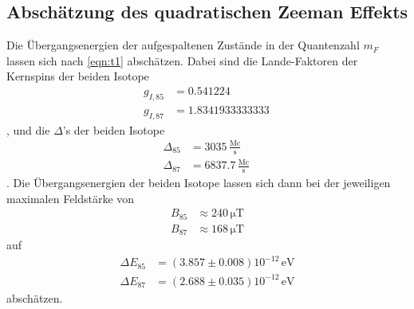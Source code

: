 \subsection{Abschätzung des quadratischen Zeeman Effekts}
\label{sec:Zeeman}
Die Übergangsenergien der aufgespaltenen Zustände in der Quantenzahl $m_F$ lassen sich nach \autoref{eqn:t1} abschätzen. Dabei sind die Lande-Faktoren der Kernspins der beiden Isotope 
\begin{align*}
  g_{I, 85} &= 0.541224 \\
  g_{I, 87} &= 1.8341933333333 \, 
\end{align*}
\cite{nuc_lande}, und die $\Delta$'s der beiden Isotope
\begin{align*}
  \Delta_{85} &= 3035 \, \frac{\mathrm{Mc}}{\mathrm{s}} \\
  \Delta_{87} &= 6837.7 \, \frac{\mathrm{Mc}}{\mathrm{s}} \,
\end{align*}
\cite{benumof}. Die Übergangsenergien der beiden Isotope lassen sich dann bei der jeweiligen maximalen Feldstärke von 
\begin{align*}
  B_{85} &\approx  240 \, \mathrm{\mu T}\\
  B_{87} &\approx  168 \, \mathrm{\mu T}
\end{align*}
auf 
\begin{align*}
  \Delta E_{85} &=  \left( 3.857 \pm 0.008 \right) 10^{-12} \, \text{eV} \\
  \Delta E_{87} &=  \left( 2.688 \pm 0.035 \right) 10^{-12} \, \text{eV}
\end{align*}
abschätzen. 